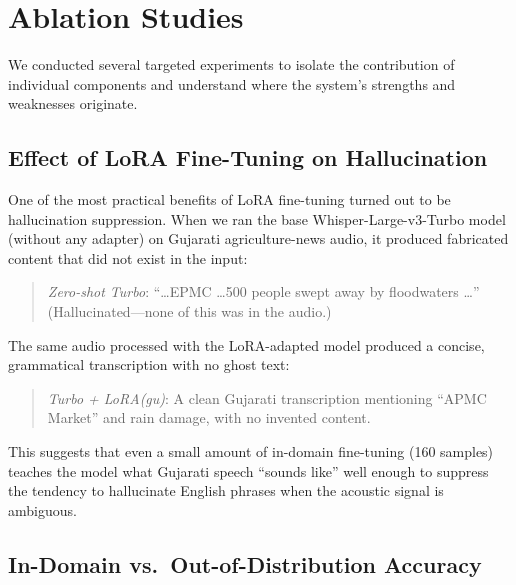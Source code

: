 
\section{Ablation Studies}
\label{sec:ablation}

We conducted several targeted experiments to isolate the contribution of individual components and understand where the system's strengths and weaknesses originate.

\subsection{Effect of LoRA Fine-Tuning on Hallucination}
\label{sec:ablation_lora}

One of the most practical benefits of LoRA fine-tuning turned out to be hallucination suppression. When we ran the base Whisper-Large-v3-Turbo model (without any adapter) on Gujarati agriculture-news audio, it produced fabricated content that did not exist in the input:

\begin{quote}
\textit{Zero-shot Turbo}: ``\ldots EPMC \ldots 500 people swept away by floodwaters \ldots'' \\ \small (Hallucinated---none of this was in the audio.)
\end{quote}

The same audio processed with the LoRA-adapted model produced a concise, grammatical transcription with no ghost text:

\begin{quote}
\textit{Turbo + LoRA(gu)}: A clean Gujarati transcription mentioning ``APMC Market'' and rain damage, with no invented content.
\end{quote}

This suggests that even a small amount of in-domain fine-tuning (160 samples) teaches the model what Gujarati speech ``sounds like'' well enough to suppress the tendency to hallucinate English phrases when the acoustic signal is ambiguous.

\subsection{In-Domain vs.\ Out-of-Distribution Accuracy}
\label{sec:ablation_ood}

